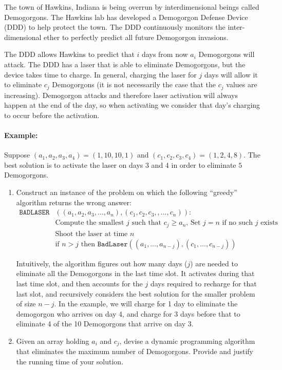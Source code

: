 
The town of Hawkins, Indiana is being overrun by interdimensional beings called Demogorgons. The Hawkins lab has developed a Demogorgon Defense Device (DDD) to help protect the town. The DDD continuously monitors the inter-dimensional ether to perfectly predict all future Demogorgon invasions.

The DDD allows Hawkins to predict that $i$ days from now $a_i$ Demogorgons will attack. The DDD has a laser that is able to eliminate Demogorgons, but the device takes time to charge.  In general, charging the laser for $j$ days will allow it to eliminate $c_j$ Demogorgons (it is not necessarily the case that the $c_j$ values are increasing). Demogorgon attacks and therefore laser activation will always happen at the end of the day, so when activating we consider that day's charging to occur before the activation.

\paragraph{Example:} Suppose $(a_1, a_2, a_3, a_4) = (1, 10, 10, 1)$ and $(c_1, c_2, c_3, c_4) = (1,2,4,8)$. The best solution is to activate the laser on days 3 and 4 in order to eliminate $5$ Demogorgons.

\begin{enumerate}
    \item Construct an instance of the problem on which the following ``greedy'' algorithm returns the wrong answer:
    \begin{align*}
        \mathtt{BADLASER}&((a_1, a_2, a_3, \ldots , a_n), (c_1, c_2, c_3, , \ldots, c_n)): \\
        & \text{Compute the smallest $j$ such that $c_j \geq  a_n$, Set $j = n$ if no such $j$ exists} \\
        & \text{Shoot the laser at time $n$}\\
        & \text{if $n > j$ then $\mathtt{BadLaser}((a_1, \ldots , a_{n - j}), (c_1, . . . , c_{n-j}))$}
    \end{align*}
    
    Intuitively, the algorithm figures out how many days ($j$) are needed to eliminate all the Demogorgons in the last time slot. It activates during that last time slot, and then accounts for the $j$ days required to recharge for that last slot, and recursively considers the best solution for the smaller problem of size $n-j$. In the example, we will charge for 1 day to eliminate the demogorgon who arrives on day 4, and charge for 3 days before that to eliminate 4 of the 10 Demogorgons that arrive on day 3.
    
    \vspace{96pt}
    
    \item Given an array holding $a_i$ and $c_j$, devise a dynamic programming algorithm that eliminates the maximum number of Demogorgons. Provide and justify the running time of your solution.
\end{enumerate}